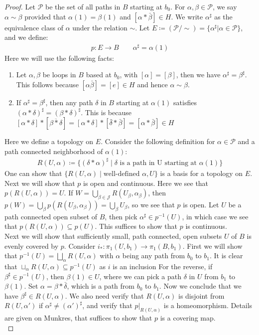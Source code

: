 \documentclass[11pt]{book}
\theoremstyle{break}
\theoremstyle{break}
\begin{document}
\begin{proof}
Let $\mathcal{P}$ be the set of all paths in $B$ starting at $b_0$. For $\alpha, \beta \in \mathcal{P}$, we say $\alpha \sim \beta$ provided that $\alpha(1) = \beta(1)$ and $[\alpha*\bar{\beta}] \in H$. We write $\alpha^{\sharp}$ as the equivalence class of $\alpha$ under the relation $\sim$. Let $E \coloneqq (\mathcal{P}/\sim) = \{\alpha^{\sharp}|\alpha \in \mathcal{P}\}$, and we define:
\begin{align*}
p:E \to B \qquad \alpha^\sharp = \alpha(1)
\end{align*}
Here we will use the following facts:
\begin{enumerate}
\item Let $\alpha,\beta$ be loops in $B$ based at $b_0$, with $[\alpha]  = [\beta]$, then we have $\alpha^\sharp =\beta^\sharp$. This follows because $[\alpha\bar{\beta}] = [e]\in H$ and hence $\alpha\sim \beta$. 
\item If $\alpha^\sharp = \beta^\sharp$, then any path $\delta$ in $B$ starting at $\alpha(1)$ satisfies $(\alpha*\delta)^\sharp = (\beta*\delta)^\sharp$. This is because $[\alpha*\delta]*[\overline{\beta*\delta}] = [\alpha*\delta]*[\bar{\delta}*\bar{\beta}] = [\alpha*\bar{\beta}] \in H$
\end{enumerate}
Here we define a topology on $E$. Consider the following definition for $\alpha \in \mathcal{P}$ and a path connected neighborhood of $\alpha(1)$:
\begin{align*}
R(U,\alpha) \coloneqq \{(\delta* \alpha)^\sharp \mid \delta \text{ is a path in U starting at }\alpha(1)\}
\end{align*}
One can show that $\{R(U,\alpha) \mid \text{well-defined }\alpha, U\}$ is a basis for a topology on $E$. Next we will show that $p$ is open and continuous. Here we see that $p(R(U,\alpha))  = U$. If $W = \bigcup_{\beta \in \mathcal{J}}R(U_\beta, \alpha_\beta)$, then $p(W) = \bigcup_\beta p(R(U_\beta, \alpha_\beta)) = \bigcup_\beta U_\beta$, so we see that $p$ is open. Let $U$ be a path connected open subset of $B$, then pick $\alpha^{\sharp} \in p^{-1}(U)$, in which case we see that $p(R(U,\alpha)) \subseteq p(U)$. This suffices to show that $p$ is continuous.\\

Next we will show that sufficiently small, path connected, open subsets $U$ of $B$ is evenly covered by $p$. Consider $i_*:\pi_1(U,b_1) \to \pi_1(B, b_1)$. First we will show that $p^{-1}(U) = \bigsqcup_{\alpha}R(U,\alpha)$ with $\alpha$ being any path from $b_0$ to $b_1$. It is clear that $\sqcup_{\alpha}R(U,\alpha) \subseteq p^{-1}(U)$ as $i$ is an inclusion For the reverse, if $\beta^\sharp \in p^{-1}(U)$, then $\beta(1) \in U$, where we can pick a path $\delta$ in $U$ from $b_1$ to $\beta(1)$. Set $\alpha = \beta* \bar{\delta}$, which is a path from $b_0$ to $b_1$. Now we conclude that we have $\beta^\sharp \in R(U,\alpha)$. We also need verify that $R(U,\alpha)$ is disjoint from $R(U,\alpha')$ if $\alpha^\sharp \neq (\alpha')^\sharp$, and verify that $p|_{R(U,\alpha)}$ is a homeomorphism. Details are given on Munkres, that suffices to show that $p$ is a covering map.\\


\end{proof}
\end{document}
